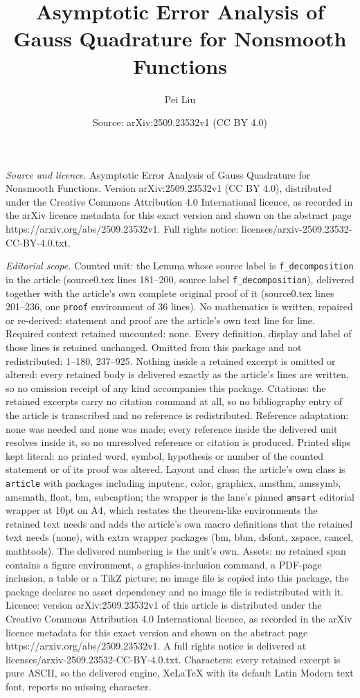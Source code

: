 \documentclass[10pt,a4paper]{amsart}
\title[Asymptotic Error Analysis of Gauss Quadrature for Nonsmooth ]{Asymptotic Error Analysis of Gauss Quadrature for Nonsmooth Functions}
\author{Pei Liu}
\date{Source: arXiv:2509.23532v1 (CC BY 4.0)}
\begin{document}
\maketitle

\noindent\emph{Source and licence.} Asymptotic Error Analysis of Gauss Quadrature for Nonsmooth Functions. Version arXiv:2509.23532v1 (CC BY 4.0), distributed under the Creative Commons Attribution 4.0 International licence, as recorded in the arXiv licence metadata for this exact version and shown on the abstract page https://arxiv.org/abs/2509.23532v1. Full rights notice: licenses/arxiv-2509.23532-CC-BY-4.0.txt.\par\smallskip

\noindent\textit{Editorial scope.} Counted unit: the Lemma whose source label is \texttt{f\_decomposition} in the article (source0.tex lines 181--200, source label \texttt{f\_decomposition}), delivered together with the article's own complete original proof of it (source0.tex lines 201--236, one \texttt{proof} environment of 36 lines). No mathematics is written, repaired or re-derived: statement and proof are the article's own text line for line. Required context retained uncounted: none. Every definition, display and label of those lines is retained unchanged. Omitted from this package and not redistributed: 1--180, 237--925. Nothing inside a retained excerpt is omitted or altered: every retained body is delivered exactly as the article's lines are written, so no omission receipt of any kind accompanies this package. Citations: the retained excerpts carry no citation command at all, so no bibliography entry of the article is transcribed and no reference is redistributed. Reference adaptation: none was needed and none was made; every reference inside the delivered unit resolves inside it, so no unresolved reference or citation is produced. Printed slips kept literal: no printed word, symbol, hypothesis or number of the counted statement or of its proof was altered. Layout and class: the article's own class is \texttt{article} with packages including inputenc, color, graphicx, amsthm, amssymb, amsmath, float, bm, subcaption; the wrapper is the lane's pinned \texttt{amsart} editorial wrapper at 10pt on A4, which restates the theorem-like environments the retained text needs and adds the article's own macro definitions that the retained text needs (none), with extra wrapper packages (bm, bbm, dsfont, xspace, cancel, mathtools). The delivered numbering is the unit's own. Assets: no retained span contains a figure environment, a graphics-inclusion command, a PDF-page inclusion, a table or a TikZ picture; no image file is copied into this package, the package declares no asset dependency and no image file is redistributed with it. Licence: version arXiv:2509.23532v1 of this article is distributed under the Creative Commons Attribution 4.0 International licence, as recorded in the arXiv licence metadata for this exact version and shown on the abstract page https://arxiv.org/abs/2509.23532v1. A full rights notice is delivered at licenses/arxiv-2509.23532-CC-BY-4.0.txt. Characters: every retained excerpt is pure ASCII, so the delivered engine, XeLaTeX with its default Latin Modern text font, reports no missing character.
\end{document}
